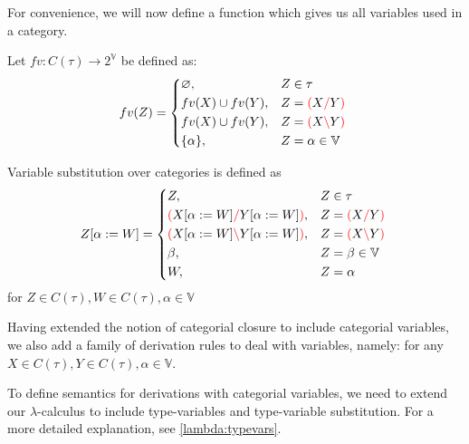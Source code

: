 \documentclass[main.tex]{subfiles}
\begin{document}
For convenience, we will now define a function which gives us all variables
used in a category.
\begin{defn}
    Let $fv: C(\tau) \rightarrow 2^{\mathbb{V}}$ be defined as:
    \[
        fv(Z) =
        \begin{cases*}
            \varnothing, & $Z \in \tau$ \\
            fv(X) \cup fv(Y), & $Z = \lp X \rc Y \rp$ \\
            fv(X) \cup fv(Y), & $Z = \lp X \lc Y \rp$ \\
            \{ \alpha \}, & $Z = \alpha \in \mathbb{V}$ \\
        \end{cases*}
    \]
\end{defn}
\begin{defn}
    Variable substitution over categories is defined as
    \[
        \subst{Z}{\alpha}{W} =
        \begin{cases*}
            Z, & $Z \in \tau$ \\
            \lp \subst{X}{\alpha}{W} \rc \subst{Y}{\alpha}{W} \rp, & $Z = \lp X \rc Y \rp$ \\
            \lp \subst{X}{\alpha}{W} \lc \subst{Y}{\alpha}{W} \rp, & $Z = \lp X \lc Y \rp$ \\
            \beta, & $Z = \beta \in \mathbb{V}$ \\
            W, & $Z = \alpha$ \\
        \end{cases*}
    \]
    for $Z \in C(\tau), W \in C(\tau), \alpha \in \mathbb{V}$
\end{defn}

Having extended the notion of categorial closure to include categorial variables,
we also add a family of derivation rules to deal with variables, namely:
for any $X \in C(\tau), Y \in C(\tau), \alpha \in \mathbb{V}$.

To define semantics for derivations with categorial variables, we need to extend
our $\lambda$-calculus to include type-variables and type-variable substitution.
For a more detailed explanation, see \cref{lambda:typevars}.

\begin{center}
\end{center}
\end{document}
